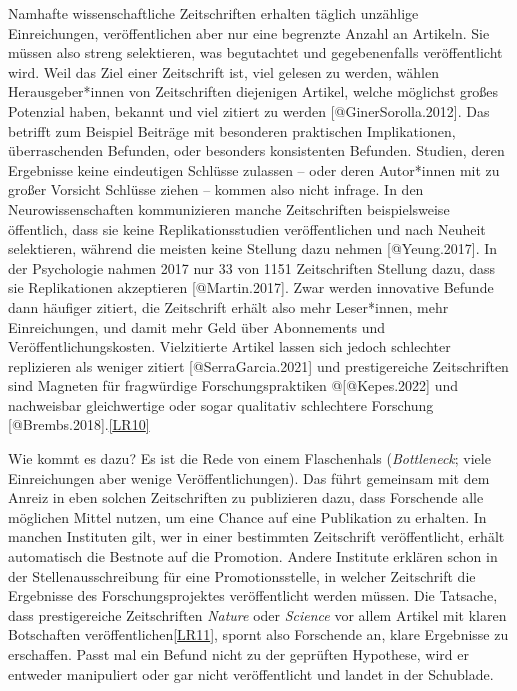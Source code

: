 \documentclass[
  letterpaper,
  DIV=11,
  numbers=noendperiod]{scrreprt}
\begin{document}
Namhafte wissenschaftliche Zeitschriften erhalten täglich unzählige
Einreichungen, veröffentlichen aber nur eine begrenzte Anzahl an
Artikeln. Sie müssen also streng selektieren, was begutachtet und
gegebenenfalls veröffentlicht wird. Weil das Ziel einer Zeitschrift ist,
viel gelesen zu werden, wählen Herausgeber*innen von Zeitschriften
diejenigen Artikel, welche möglichst großes Potenzial haben, bekannt und
viel zitiert zu werden {[}@GinerSorolla.2012{]}. Das betrifft zum
Beispiel Beiträge mit besonderen praktischen Implikationen,
überraschenden Befunden, oder besonders konsistenten Befunden. Studien,
deren Ergebnisse keine eindeutigen Schlüsse zulassen -- oder deren
Autor*innen mit zu großer Vorsicht Schlüsse ziehen -- kommen also nicht
infrage. In den Neurowissenschaften kommunizieren manche Zeitschriften
beispielsweise öffentlich, dass sie keine Replikationsstudien
veröffentlichen und nach Neuheit selektieren, während die meisten keine
Stellung dazu nehmen {[}@Yeung.2017{]}. In der Psychologie nahmen 2017
nur 33 von 1151 Zeitschriften Stellung dazu, dass sie Replikationen
akzeptieren {[}@Martin.2017{]}. Zwar werden innovative Befunde dann
häufiger zitiert, die Zeitschrift erhält also mehr Leser*innen, mehr
Einreichungen, und damit mehr Geld über Abonnements und
Veröffentlichungskosten. Vielzitierte Artikel lassen sich jedoch
schlechter replizieren als weniger zitiert {[}@SerraGarcia.2021{]} und
prestigereiche Zeitschriften sind Magneten für fragwürdige
Forschungspraktiken @{[}@Kepes.2022{]} und nachweisbar gleichwertige
oder sogar qualitativ schlechtere Forschung
{[}@Brembs.2018{]}.\hyperref[_msocom_10]{{[}LR10{]}}~

Wie kommt es dazu? Es ist die Rede von einem Flaschenhals
(\emph{Bottleneck}; viele Einreichungen aber wenige Veröffentlichungen).
Das führt gemeinsam mit dem Anreiz in eben solchen Zeitschriften zu
publizieren dazu, dass Forschende alle möglichen Mittel nutzen, um eine
Chance auf eine Publikation zu erhalten. In manchen Instituten gilt, wer
in einer bestimmten Zeitschrift veröffentlicht, erhält automatisch die
Bestnote auf die Promotion. Andere Institute erklären schon in der
Stellenausschreibung für eine Promotionsstelle, in welcher Zeitschrift
die Ergebnisse des Forschungsprojektes veröffentlicht werden müssen. Die
Tatsache, dass prestigereiche Zeitschriften \emph{Nature} oder
\emph{Science} vor allem Artikel mit klaren Botschaften
veröffentlichen\hyperref[_msocom_11]{{[}LR11{]}}, spornt also Forschende
an, klare Ergebnisse zu erschaffen. Passt mal ein Befund nicht zu der
geprüften Hypothese, wird er entweder manipuliert oder gar nicht
veröffentlicht und landet in der Schublade.
\end{document}
